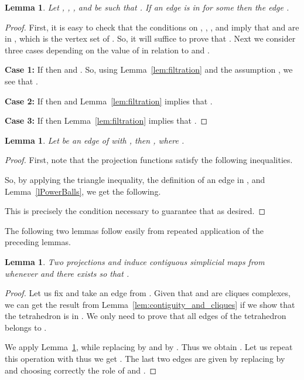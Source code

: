 \documentclass[a4paper]{article}
\newtheorem{lemma}[theorem]{Lemma}
\begin{document}
  \begin{lemma}\label{lem:proj_and_Q_for_one_edge}
    Let , , , and  be such that .
    If an edge  is in  for some  then the edge .
  \end{lemma}
  \begin{proof}
    First, it is easy to check that the conditions on , , , and  imply that  and  are in , which is the vertex set of .
    So, it will suffice to prove that .
    Next we consider three cases depending on the value of  in relation to  and .
  
    \noindent\textbf{Case 1:} If  then  and .
    So, using Lemma~\ref{lem:filtration} and the assumption , we see that .
  
    \noindent\textbf{Case 2:} If  then  and Lemma~\ref{lem:filtration} implies that .
    
  
    \noindent\textbf{Case 3:} If  then Lemma~\ref{lem:filtration} implies that .
    
  \end{proof}



  \begin{lemma}\label{lem:proj_and_R_for_one_edge}
Let  be an edge of  with , then , where .
  \end{lemma}
  \begin{proof}
    First, note that the projection functions satisfy the following inequalities.
    
    So, by applying the triangle inequality, the definition of an edge in , and Lemma~\ref{lPowerBalls}, we get the following.
    
    This is precisely the condition necessary to guarantee that  as desired.
  \end{proof}

  The following two lemmas follow easily from repeated application of the preceding lemmas.

  \begin{lemma}\label{lem:proj_and_Q}
    Two projections  and  induce contiguous simplicial maps from  whenever  and there exists  so that .
  \end{lemma}
  
\begin{proof}
Let us fix  and take  an edge from . 
Given that  and  are cliques complexes, we can get the result from Lemma~\ref{lem:contiguity_and_cliques} if we show that the tetrahedron  is in .
We only need to prove that all edges of the tetrahedron belongs to .

We apply Lemma~\ref{lem:proj_and_Q_for_one_edge}, while replacing  by  and  by . Thus we obtain .
Let us repeat this operation with  thus we get .
The last two edges are given by replacing  by  and choosing correctly the role of  and .
\end{proof}
\end{document}

